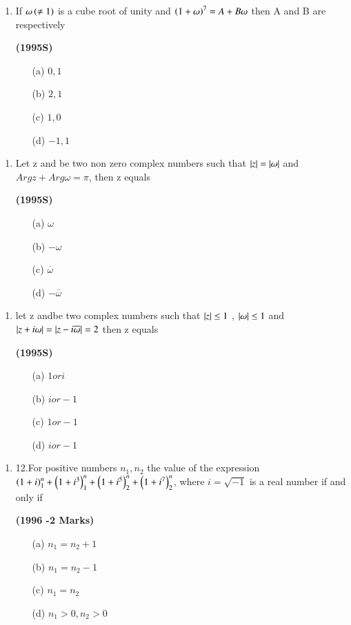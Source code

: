 \documentclass[journal,12pt,twocolumn]{IEEEtran}
\theoremstyle{remark}
\begin{document}
\begin{enumerate}[start=9]
\item If $\omega\left(\neq1\right)$ is a cube root of unity and $\left(1+\omega\right)^7=A+B\omega$ then A and B are respectively

\hfill{\textbf{(1995S)}}

\begin{enumerate}
\item[(a)]$0,1$
\item[(b)]$2,1$
\item[(c)]$1,0$
\item[(d)]$-1,1$
\end{enumerate}
\end{enumerate}
\begin{enumerate}[start=10]
\item Let z and \omega be two non zero complex numbers such that $\left\vert z\right\vert=\left\vert\omega\right\vert$ and $Argz+Arg\omega=\pi$, then z equals 

\hfill{\textbf{(1995S)}}

\begin{enumerate}
\item[(a)]$\omega$
\item[(b)]$-\omega$
\item[(c)]$\overline{\omega}$
\item[(d)]$-\overline{\omega}$
\end{enumerate}
\end{enumerate}
\begin{enumerate}[start=11]
\item let z and\omega be two complex numbers such that $\left\vert z\right\vert\leq1$ , $\left\vert\omega\right\vert\leq1$ and $\left\vert z+i\omega\right\vert=\left\vert z-i\overline{\omega}\right\vert=2$ then z equals 

\hfill{\textbf{(1995S)}}

\begin{enumerate}
\item[(a)]$1 or i$
\item[(b)]$i or -1$
\item[(c)]$1 or -1$
\item[(d)]$i or -1$
\end{enumerate}
\end{enumerate}
\begin{enumerate}
\item{12.}For positive numbers $n_1,n_2$ the value of the expression $\left(1+i\right)^n_1+\left(1+i^3\right)^n_1+\left(1+i^5\right)^n_2+\left(1+i^7\right)^n_2$, where $i=\sqrt{-1}$ is a real number if and only if

\hfill{\textbf{(1996 -2 Marks)}}

\begin{enumerate}
\item[(a)]$n_1=n_2+1$
\item[(b)]$n_1=n_2-1$
\item[(c)]$n_1=n_2$
\item[(d)]$n_1>0,n_2>0$
\end{enumerate}
\end{enumerate}
\end{document}
